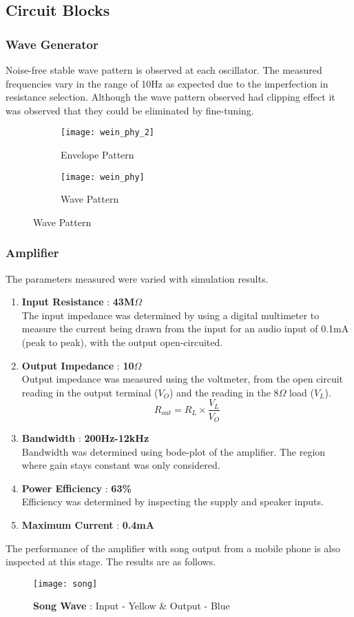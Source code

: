\subsection{Circuit Blocks}
\subsubsection*{Wave Generator}
Noise-free stable wave pattern is observed at each oscillator. The measured frequencies vary in the range of 10Hz as expected due to the imperfection in resistance selection. Although the wave pattern observed had  clipping effect it was observed that they could be eliminated by fine-tuning.
\begin{figure}[h]
    \begin{subfigure}{.48\columnwidth}
        \texttt{[image: wein\_phy\_2]}
        \caption*{Envelope Pattern}
    \end{subfigure}
    \begin{subfigure}{.48\columnwidth}
        \texttt{[image: wein\_phy]}
        \caption*{Wave Pattern}
    \end{subfigure}
\end{figure}

\subsubsection*{Amplifier}
The parameters measured were varied with simulation results.
\begin{enumerate}
    \item \textbf{Input Resistance} : \textbf{43M$\Omega$}\\The input impedance was determined by using a digital multimeter to measure the current being drawn from the input for an audio input of 0.1mA (peak to peak), with the output open-circuited.
    \item \textbf{Output Impedance} : \textbf{10$\Omega$}\\Output impedance was measured using the voltmeter, from the open circuit reading in the output terminal ($V_O$) and the reading in the 8$\Omega$ load ($V_L$).
          $$R_{out}=R_L\times\frac{V_L}{V_O}$$
    \item \textbf{Bandwidth} : \textbf{200Hz-12kHz}\\Bandwidth was determined using bode-plot of the amplifier. The region where gain stays constant was only considered.
    \item \textbf{Power Efficiency} : \textbf{63\%}\\
          Efficiency was determined by inspecting the supply and speaker inputs.
    \item \textbf{Maximum Current} : \textbf{0.4mA}
\end{enumerate}
The performance of the amplifier with song output from a mobile phone is also inspected at this stage. The results are as follows.
\begin{figure}[h]
    \centering
    \texttt{[image: song]}
    \caption*{\textbf{Song Wave} : Input - Yellow \& Output - Blue}
\end{figure}

